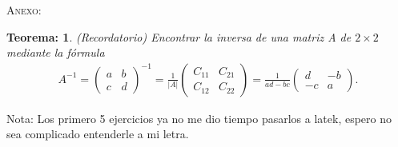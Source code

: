 \documentclass[11pt,letterpaper]{article}
\newtheorem{thmt}{Teorema:}
\begin{document}
\begin{itemize}
\textsc{Anexo:} 
\begin{framed}
    \begin{thmt} \label{t_inversa}
	(Recordatorio) Encontrar la inversa de una matriz A de $2\times 2$ mediante la fórmula
\begin{align*}
A^{-1}=\begin{pmatrix}
a & b\\
c & d
\end{pmatrix}^{-1}=\frac{1}{|A|}\begin{pmatrix}
C_{11} & C_{21}\\
C_{12} & C_{22}
\end{pmatrix}=\frac{1}{ad-bc}\begin{pmatrix}
d & -b\\
-c & a
\end{pmatrix}.
\end{align*}
    \end{thmt}
\end{framed}

Nota: Los primero 5 ejercicios ya no me dio tiempo pasarlos a latek, espero no sea complicado entenderle a mi letra. 

\end{itemize}
\end{document}
